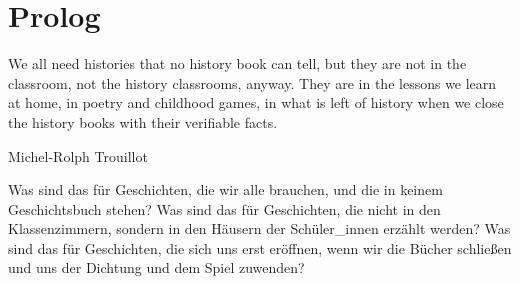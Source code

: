 \section{Prolog}
\epigraph{ We all need histories that no history book can
  tell, but they are not in the classroom, not the history classrooms, anyway.
  They are in the lessons we learn at home, in poetry and childhood games, in
  what is left of history when we close the history books with their verifiable
facts.}{Michel-Rolph Trouillot\footnotemark} 

Was sind das für Geschichten, die wir alle brauchen, und die in keinem
Geschichtsbuch stehen? Was sind das für Geschichten, die nicht in den
Klassenzimmern, sondern in den Häusern der Schüler\_innen erzählt werden? Was
sind das für Geschichten, die sich uns erst eröffnen, wenn wir die Bücher
schließen und uns der Dichtung und dem Spiel zuwenden?

